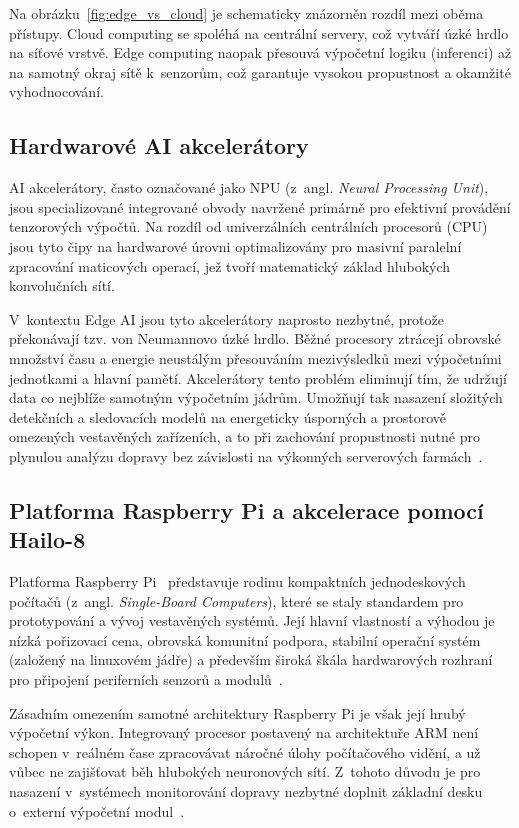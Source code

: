 Na obrázku~\ref{fig:edge_vs_cloud} je schematicky znázorněn rozdíl mezi oběma přístupy. Cloud computing se spoléhá na centrální servery, což vytváří úzké hrdlo na síťové vrstvě. Edge computing naopak přesouvá výpočetní logiku (inferenci) až na samotný okraj sítě k~senzorům, což garantuje vysokou propustnost a okamžité vyhodnocování.

\subsection{Hardwarové AI akcelerátory}
AI akcelerátory, často označované jako \acs{NPU} (z~angl. \textit{Neural Processing Unit}), jsou specializované integrované obvody navržené primárně pro efektivní provádění tenzorových výpočtů. Na rozdíl od univerzálních centrálních procesorů (\acs{CPU}) jsou tyto čipy na hardwarové úrovni optimalizovány pro masivní paralelní zpracování maticových operací, jež tvoří matematický základ hlubokých konvolučních sítí.

V~kontextu Edge AI jsou tyto akcelerátory naprosto nezbytné, protože překonávají tzv. von Neumannovo úzké hrdlo. Běžné procesory ztrácejí obrovské množství času a energie neustálým přesouváním mezivýsledků mezi výpočetními jednotkami a hlavní pamětí. Akcelerátory tento problém eliminují tím, že udržují data co nejblíže samotným výpočetním jádrům. Umožňují tak nasazení složitých detekčních a sledovacích modelů na energeticky úsporných a prostorově omezených vestavěných zařízeních, a to při zachování propustnosti nutné pro plynulou analýzu dopravy bez závislosti na výkonných serverových farmách~\cite{hailo_alpr_2024, hailo_architecture_2026}.

\subsection{Platforma Raspberry Pi a akcelerace pomocí Hailo-8}
Platforma Raspberry Pi~\cite{rpishop_ai_hat} představuje rodinu kompaktních jednodeskových počítačů (z~angl. \textit{Single-Board Computers}), které se staly standardem pro prototypování a vývoj vestavěných systémů. Její hlavní vlastností a výhodou je nízká pořizovací cena, obrovská komunitní podpora, stabilní operační systém (založený na linuxovém jádře) a především široká škála hardwarových rozhraní pro připojení periferních senzorů a modulů~\cite{raspberrypi_docs_2024}.

Zásadním omezením samotné architektury Raspberry Pi je však její hrubý výpočetní výkon. Integrovaný procesor postavený na architektuře \acs{ARM} není schopen v~reálném čase zpracovávat náročné úlohy počítačového vidění, a už vůbec ne zajišťovat běh hlubokých neuronových sítí. Z~tohoto důvodu je pro nasazení v~systémech monitorování dopravy nezbytné doplnit základní desku o~externí výpočetní modul~\cite{raspberrypi_ai_kit}.

